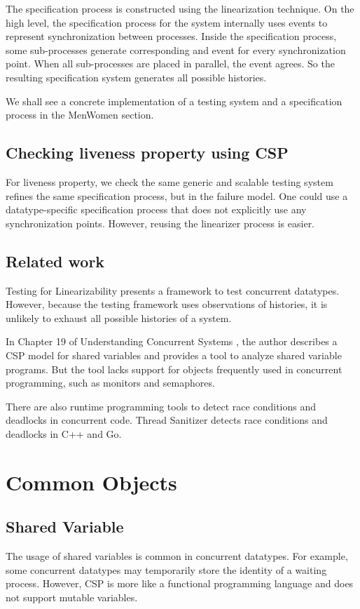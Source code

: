 \documentclass{article}
\begin{document}
The specification process is constructed using the linearization technique. On the high level, the specification process for the system internally uses  events to represent synchronization between processes. Inside the specification process, some sub-processes generate corresponding  and  event for every synchronization point. When all sub-processes are placed in parallel, the  event agrees. So the resulting specification system generates all possible histories. 

We shall see a concrete implementation of a testing system and a specification process in the MenWomen section. 

\subsection{Checking liveness property using CSP}
For liveness property, we check the same generic and scalable testing system refines the same specification process, but in the failure model. One could use a datatype-specific specification process that does not explicitly use any synchronization points. However, reusing the linearizer process is easier. 

\subsection{Related work}
Testing for Linearizability \cite{linearizability-testing} presents a framework to test concurrent datatypes. However, because the testing framework uses observations of histories, it is unlikely to exhaust all possible histories of a system.

In Chapter 19 of Understanding Concurrent Systems \cite{ucs-book}, the author describes a CSP model for shared variables and provides a tool to analyze shared variable programs. But the tool lacks support for objects frequently used in concurrent programming, such as monitors and semaphores.

There are also runtime programming tools to detect race conditions and deadlocks in concurrent code. Thread Sanitizer \cite{threadsanitizer} detects race conditions and deadlocks in C++ and Go.
\section{Common Objects}
\subsection{Shared Variable}
The usage of shared variables is common in concurrent datatypes. For example, some concurrent datatypes may temporarily store the identity of a waiting process. However, CSP is more like a functional programming language and does not support mutable variables. 
\end{document}
